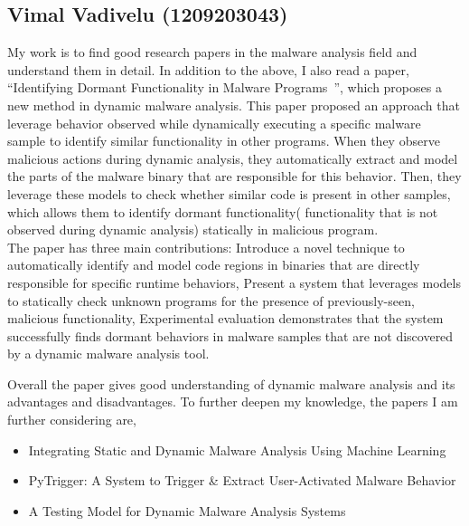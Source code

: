 \documentclass[11pt]{article}
\begin{document}
		\subsection{Vimal Vadivelu (1209203043)}
		My work is to find good research papers in the malware analysis field and understand them in detail. In addition to the above, I also read a paper, “Identifying Dormant Functionality in Malware Programs~\cite{comparetti2010identifying}”, which proposes a new method in dynamic malware analysis. 
		This paper proposed an approach that leverage behavior observed while dynamically executing a specific malware sample to identify similar functionality in other programs. When they observe malicious actions during dynamic analysis, they automatically extract and model the parts of the malware binary that are responsible for this behavior. Then, they leverage these models to check whether similar code is present in other samples, which allows them to identify dormant functionality( functionality that is not observed during dynamic analysis) statically in malicious program.\\
		The paper has three main contributions:
		Introduce a novel technique to automatically identify and model code regions in binaries that are directly responsible for specific runtime behaviors,
		Present a system that leverages models to statically check unknown programs for the presence of previously-seen, malicious functionality,
		Experimental evaluation demonstrates that the system successfully finds dormant behaviors in malware samples that are not discovered by a dynamic malware analysis tool.
		
		
		Overall the paper gives good understanding of dynamic malware analysis and its advantages and disadvantages. To further deepen my knowledge, the papers I am further considering are,
		\begin{itemize}[noitemsep]
			\item Integrating Static and Dynamic Malware Analysis Using Machine Learning~\cite{mangialardo2015integrating}
			\item PyTrigger: A System to Trigger \& Extract User-Activated Malware Behavior~\cite{fleck2013pytrigger}
			\item A Testing Model for Dynamic Malware Analysis Systems~\cite{massicotte2012testing}
		\end{itemize}
		
\end{document}
